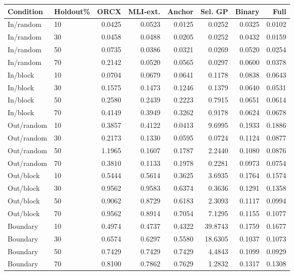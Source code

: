 \begin{tabular}{llrrrrrr}
\toprule
Condition & Holdout\% & ORCX & MLI-ext. & Anchor & Sel. GP & Binary & Full \\
\midrule
In/random & 10 & 0.0425 & 0.0523 & 0.0125 & 0.0252 & 0.0325 & 0.0102 \\
In/random & 30 & 0.0458 & 0.0488 & 0.0205 & 0.0252 & 0.0432 & 0.0159 \\
In/random & 50 & 0.0735 & 0.0386 & 0.0321 & 0.0269 & 0.0520 & 0.0254 \\
In/random & 70 & 0.2142 & 0.0520 & 0.0565 & 0.0297 & 0.0600 & 0.0378 \\
In/block & 10 & 0.0704 & 0.0679 & 0.0641 & 0.1178 & 0.0838 & 0.0643 \\
In/block & 30 & 0.1575 & 0.1473 & 0.1246 & 0.1379 & 0.0640 & 0.0531 \\
In/block & 50 & 0.2580 & 0.2439 & 0.2223 & 0.7915 & 0.0651 & 0.0614 \\
In/block & 70 & 0.4149 & 0.3949 & 0.3262 & 0.9178 & 0.0624 & 0.0678 \\
Out/random & 10 & 0.3857 & 0.4122 & 0.0413 & 9.6995 & 0.1933 & 0.1886 \\
Out/random & 30 & 0.2173 & 0.1330 & 0.0595 & 0.0724 & 0.1124 & 0.0877 \\
Out/random & 50 & 1.1965 & 0.1607 & 0.1787 & 2.2440 & 0.1080 & 0.0876 \\
Out/random & 70 & 0.3810 & 0.1133 & 0.1978 & 0.2281 & 0.0973 & 0.0754 \\
Out/block & 10 & 0.5444 & 0.5614 & 0.3625 & 3.6935 & 0.1764 & 0.1574 \\
Out/block & 30 & 0.9562 & 0.9583 & 0.6374 & 0.3636 & 0.1291 & 0.1358 \\
Out/block & 50 & 0.9062 & 0.8729 & 0.6183 & 2.3093 & 0.1117 & 0.0994 \\
Out/block & 70 & 0.9562 & 0.8914 & 0.7054 & 7.1295 & 0.1155 & 0.1077 \\
Boundary & 10 & 0.4974 & 0.4737 & 0.4322 & 39.8743 & 0.1759 & 0.1677 \\
Boundary & 30 & 0.6574 & 0.6297 & 0.5580 & 18.6305 & 0.1037 & 0.1073 \\
Boundary & 50 & 0.7429 & 0.7429 & 0.7429 & 4.4843 & 0.1099 & 0.0929 \\
Boundary & 70 & 0.8100 & 0.7862 & 0.7629 & 1.2832 & 0.1317 & 0.1308 \\
\bottomrule
\end{tabular}
